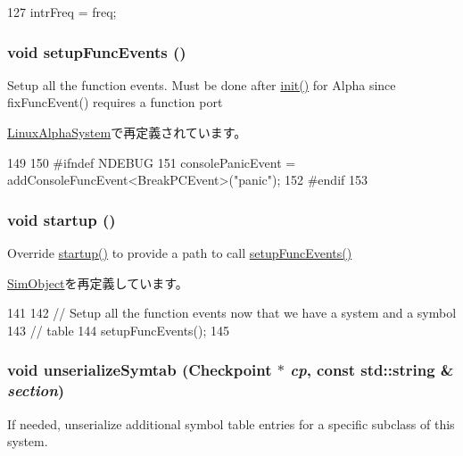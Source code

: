 \begin{DoxyCode}
127 { intrFreq = freq; }
\end{DoxyCode}
\hypertarget{classAlphaSystem_ae36115f702dd2f9ead5df8d632632cf7}{
\subsubsection[{setupFuncEvents}]{\setlength{\rightskip}{0pt plus 5cm}void setupFuncEvents ()}}
\label{classAlphaSystem_ae36115f702dd2f9ead5df8d632632cf7}
Setup all the function events. Must be done after \hyperlink{classSystem_a02fd73d861ef2e4aabb38c0c9ff82947}{init()} for Alpha since fixFuncEvent() requires a function port 

\hyperlink{classLinuxAlphaSystem_ae36115f702dd2f9ead5df8d632632cf7}{LinuxAlphaSystem}で再定義されています。


\begin{DoxyCode}
149 {
150 #ifndef NDEBUG
151     consolePanicEvent = addConsoleFuncEvent<BreakPCEvent>("panic");
152 #endif
153 }
\end{DoxyCode}
\hypertarget{classAlphaSystem_aecc7d8debf54990ffeaaed5bac7d7d81}{
\subsubsection[{startup}]{\setlength{\rightskip}{0pt plus 5cm}void startup ()}}
\label{classAlphaSystem_aecc7d8debf54990ffeaaed5bac7d7d81}
Override \hyperlink{classAlphaSystem_aecc7d8debf54990ffeaaed5bac7d7d81}{startup()} to provide a path to call \hyperlink{classAlphaSystem_ae36115f702dd2f9ead5df8d632632cf7}{setupFuncEvents()} 

\hyperlink{classSimObject_aecc7d8debf54990ffeaaed5bac7d7d81}{SimObject}を再定義しています。


\begin{DoxyCode}
141 {
142     // Setup all the function events now that we have a system and a symbol
143     // table
144     setupFuncEvents();
145 }
\end{DoxyCode}
\hypertarget{classAlphaSystem_a183b92b9eac0994f5d446702e995132a}{
\subsubsection[{unserializeSymtab}]{\setlength{\rightskip}{0pt plus 5cm}void unserializeSymtab ({\bf Checkpoint} $\ast$ {\em cp}, \/  const std::string \& {\em section})}}
\label{classAlphaSystem_a183b92b9eac0994f5d446702e995132a}
If needed, unserialize additional symbol table entries for a specific subclass of this system.


